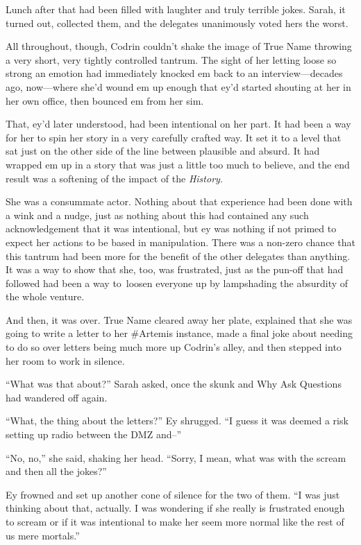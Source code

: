 Lunch after that had been filled with laughter and truly terrible jokes. Sarah, it turned out, collected them, and the delegates unanimously voted hers the worst.

All throughout, though, Codrin couldn't shake the image of True Name throwing a very short, very tightly controlled tantrum. The sight of her letting loose so strong an emotion had immediately knocked em back to an interview—decades ago, now—where she'd wound em up enough that ey'd started shouting at her in her own office, then bounced em from her sim.

That, ey'd later understood, had been intentional on her part. It had been a way for her to spin her story in a very carefully crafted way. It set it to a level that sat just on the other side of the line between plausible and absurd. It had wrapped em up in a story that was just a little too much to believe, and the end result was a softening of the impact of the \emph{History}.

She was a consummate actor. Nothing about that experience had been done with a wink and a nudge, just as nothing about this had contained any such acknowledgement that it was intentional, but ey was nothing if not primed to expect her actions to be based in manipulation. There was a non-zero chance that this tantrum had been more for the benefit of the other delegates than anything. It was a way to show that she, too, was frustrated, just as the pun-off that had followed had been a way to\pagebreak~loosen everyone up by lampshading the absurdity of the whole venture.

And then, it was over. True Name cleared away her plate, explained that she was going to write a letter to her \#Artemis instance, made a final joke about needing to do so over letters being much more up Codrin's alley, and then stepped into her room to work in silence.

``What was that about?'' Sarah asked, once the skunk and Why Ask Questions had wandered off again.

``What, the thing about the letters?'' Ey shrugged. ``I guess it was deemed a risk setting up radio between the DMZ and--''

``No, no,'' she said, shaking her head. ``Sorry, I mean, what was with the scream and then all the jokes?''

Ey frowned and set up another cone of silence for the two of them. ``I was just thinking about that, actually. I was wondering if she really is frustrated enough to scream or if it was intentional to make her seem more normal like the rest of us mere mortals.''

